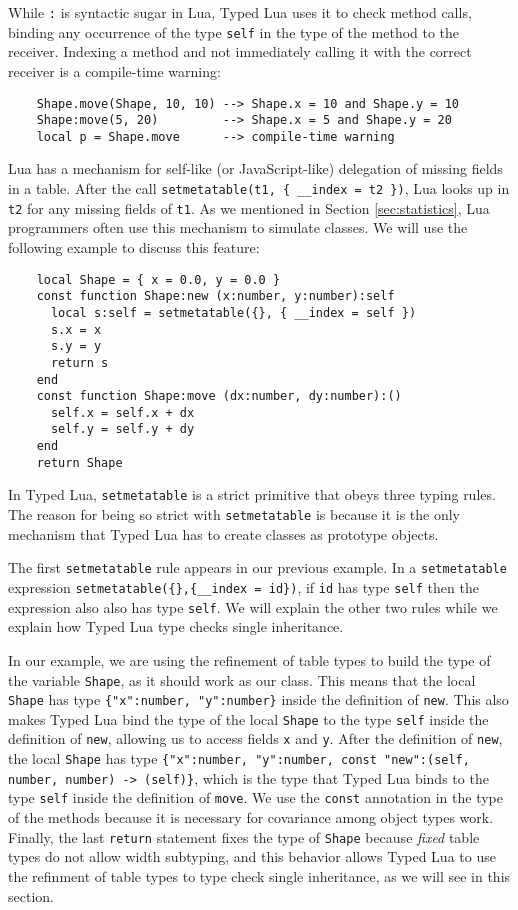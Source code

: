 While \texttt{:} is syntactic sugar in Lua, Typed Lua uses it
to check method calls, binding any occurrence of the type \texttt{self}
in the type of the method to the receiver.
Indexing a method and not immediately calling it with the correct
receiver is a compile-time warning:
\begin{verbatim}
    Shape.move(Shape, 10, 10) --> Shape.x = 10 and Shape.y = 10
    Shape:move(5, 20)         --> Shape.x = 5 and Shape.y = 20
    local p = Shape.move      --> compile-time warning
\end{verbatim}

Lua has a mechanism for self-like (or JavaScript-like) delegation of
missing fields in a table.
After the call \texttt{setmetatable(t1, \{ \string_\string_index = t2 \})},
Lua looks up in \texttt{t2} for any missing fields of \texttt{t1}.
As we mentioned in Section \ref{sec:statistics},
Lua programmers often use this mechanism to simulate classes.
We will use the following example to discuss this feature:
\begin{verbatim}
    local Shape = { x = 0.0, y = 0.0 }
    const function Shape:new (x:number, y:number):self
      local s:self = setmetatable({}, { __index = self })
      s.x = x
      s.y = y
      return s
    end
    const function Shape:move (dx:number, dy:number):()
      self.x = self.x + dx
      self.y = self.y + dy
    end
    return Shape
\end{verbatim}

In Typed Lua, \texttt{setmetatable} is a strict primitive
that obeys three typing rules.
The reason for being so strict with \texttt{setmetatable} is because
it is the only mechanism that Typed Lua has to create classes
as prototype objects.

The first \texttt{setmetatable} rule appears in our previous example.
In a \texttt{setmetatable} expression
\texttt{setmetatable(\{\},\{\string_\string_index = id\})},
if \texttt{id} has type \texttt{self} then the expression also also has type \texttt{self}.
We will explain the other two rules while we explain how
Typed Lua type checks single inheritance.

In our example, we are using the refinement of table types to
build the type of the variable \texttt{Shape},
as it should work as our class.
This means that the local \texttt{Shape} has type
\texttt{\{"x":number, "y":number\}} inside the definition of \texttt{new}.
This also makes Typed Lua bind the type of the local \texttt{Shape}
to the type \texttt{self} inside the definition of \texttt{new},
allowing us to access fields \texttt{x} and \texttt{y}.
After the definition of \texttt{new}, the local \texttt{Shape}
has type
\texttt{\{"x":number, "y":number, const "new":(self, number, number) -> (self)\}},
which is the type that Typed Lua binds to the type \texttt{self}
inside the definition of \texttt{move}.
We use the \texttt{const} annotation in the type of the methods
because it is necessary for covariance among object types work.
Finally, the last \texttt{return} statement fixes the type of
\texttt{Shape} because \emph{fixed} table types do not allow width
subtyping, and this behavior allows Typed Lua to use the refinment
of table types to type check single inheritance, as we will see in
this section.

